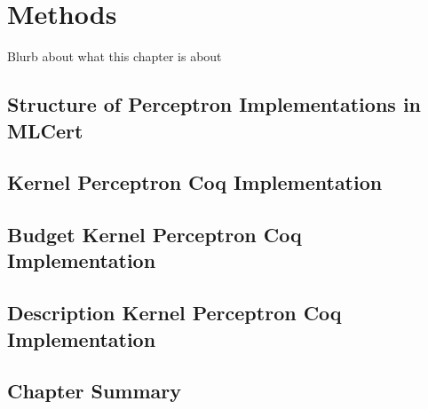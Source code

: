 \chapter{Methods}\label{MethodsChapter}
Blurb about what this chapter is about
\section{Structure of Perceptron Implementations in MLCert}\label{MLCertStruct}
\section{Kernel Perceptron Coq Implementation}\label{KPCoqImp}
\section{Budget Kernel Perceptron Coq Implementation}\label{KPBCoqImp}
\section{Description Kernel Perceptron Coq Implementation}\label{KPDCoqImp}
\section{Chapter Summary}\label{MethodsChapterSummarySection}
